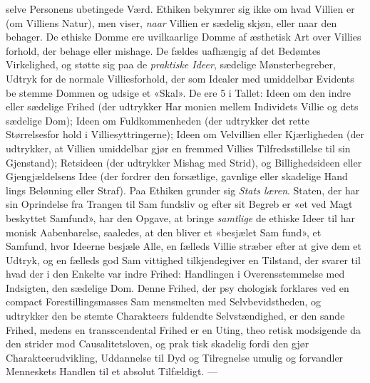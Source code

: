 \documentclass[12pt,a4paper]{book}
\begin{document}
selve Personens ubetingede Værd. Ethiken bekymrer sig ikke
om hvad Villien er (om Villiens Natur), men viser, \emph{naar}
Villien er sædelig skjøn, eller naar den behager. De ethiske
Domme ere uvilkaarlige Domme af æsthetisk Art over Villies\-%
forhold, der behage eller mishage. De fældes uafhængig af
det Bedømtes Virkelighed, og støtte sig paa de \emph{praktiske
Ideer}, sædelige Mønsterbegreber, Udtryk for de normale
Villiesforhold, der som Idealer med umiddelbar Evidents be\-%
stemme Dommen og udsige et «Skal». De ere 5 i Tallet:
Ideen om den indre eller sædelige Frihed (der udtrykker Har\-%
monien mellem Individets Villie og dets sædelige Dom); Ideen
om Fuldkommenheden (der udtrykker det rette Størrelsesfor\-%
hold i Villiesyttringerne); Ideen om Velvillien eller Kjærligheden
(der udtrykker, at Villien umiddelbar gjør en fremmed Villies
Tilfredsstillelse til sin Gjenstand); Retsideen (der udtrykker
Mishag med Strid), og Billighedsideen eller Gjengjældelsens
Idee (der fordrer den forsætlige, gavnlige eller skadelige Hand\-%
lings Belønning eller Straf). Paa Ethiken grunder sig \emph{Stats\-%
læren}. Staten, der har sin Oprindelse fra Trangen til Sam\-%
fundsliv og efter sit Begreb er «et ved Magt beskyttet Samfund»,
har den Opgave, at bringe \emph{samtlige} de ethiske Ideer til har\-%
monisk Aabenbarelse, saaledes, at den bliver et «besjælet Sam\-%
fund», et Samfund, hvor Ideerne besjæle Alle, en fælleds Villie
stræber efter at give dem et Udtryk, og en fælleds god Sam\-%
vittighed tilkjendegiver en Tilstand, der svarer til hvad der i
den Enkelte var indre Frihed: Handlingen i Overensstemmelse
med Indsigten, den sædelige Dom. Denne Frihed, der psy\-%
chologisk forklares ved en compact Forestillingsmasses Sam\-%
mensmelten med Selvbevidstheden, og udtrykker den be\-%
stemte Charakteers fuldendte Selvstændighed, er den sande
Frihed, medens en transscendental Frihed er en Uting, theo\-%
retisk modsigende da den strider mod Causalitetsloven, og prak\-%
tisk skadelig fordi den gjør Charakteerudvikling, Uddannelse
til Dyd og Tilregnelse umulig og forvandler Menneskets
Handlen til et absolut Tilfældigt. ---
\end{document}

